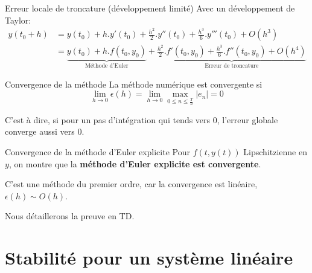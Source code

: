 \documentclass{beamer}
\begin{document}
\begin{frame}{Erreur locale de troncature (développement limité)}
    Avec un développement de Taylor:
    \begin{align*}
        y(t_0 + h) & = y(t_0) + h.y'(t_0) + \frac{h^2}{2}.y''(t_0) + \frac{h^3}{6}.y'''(t_0) + O(h^3)                                                                                              \\
                   & = \underbrace{y(t_0) + h.f(t_0, y_0)}_{\text{Méthode d'Euler}} + \underbrace{\frac{h^2}{2}.f'(t_0, y_0) + \frac{h^3}{6}.f''(t_0, y_0) + O(h^4)}_{\text{Erreur de troncature}}
    \end{align*}
\end{frame}

\begin{frame}{Convergence de la méthode}
    La méthode numérique est convergente si
    \[\lim_{h \rightarrow 0} \epsilon(h) = \lim_{h \rightarrow 0} \max_{0 \leq n \leq \frac{T}{h}} |e_n| = 0 \]

    C'est à dire, si pour un pas d'intégration qui tends vers 0, l'erreur globale converge aussi vers 0.

\end{frame}


\begin{frame}{Convergence de la méthode d'Euler explicite}
    Pour $f(t,y(t))$ Lipschitzienne en $y$, on montre que la \textbf{méthode d'Euler explicite est convergente}.

    C'est une méthode du premier ordre, car la convergence est linéaire, $\epsilon(h) \sim O(h)$.

    Nous détaillerons la preuve en TD.

\end{frame}


\section{Stabilité pour un système linéaire}
\end{document}
